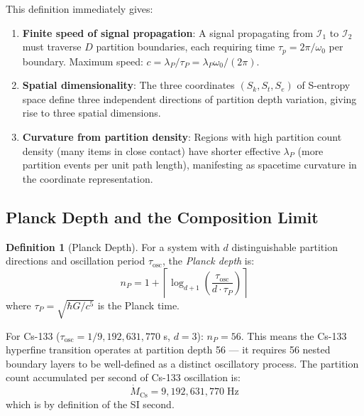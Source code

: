 \documentclass[11pt,twocolumn,a4paper]{article}
\theoremstyle{plain}
\theoremstyle{definition}
\newtheorem{definition}[theorem]{Definition}
\theoremstyle{remark}
\begin{document}
This definition immediately gives:
\begin{enumerate}
    \item \textbf{Finite speed of signal propagation}: A signal propagating
          from $\mathcal{I}_1$ to $\mathcal{I}_2$ must traverse $D$ partition
          boundaries, each requiring time $\tau_p = 2\pi/\omega_0$ per boundary.
          Maximum speed: $c = \lambda_P/\tau_P = \lambda_P \omega_0/(2\pi)$.

    \item \textbf{Spatial dimensionality}: The three coordinates $(S_k, S_t,
          S_e)$ of S-entropy space define three independent directions of
          partition depth variation, giving rise to three spatial dimensions.

    \item \textbf{Curvature from partition density}: Regions with high
          partition count density (many items in close contact) have shorter
          effective $\lambda_P$ (more partition events per unit path length),
          manifesting as spacetime curvature in the coordinate representation.
\end{enumerate}

\subsection{Planck Depth and the Composition Limit}
\label{subsec:planck_depth}

\begin{definition}[Planck Depth]
\label{def:planck_depth}
For a system with $d$ distinguishable partition directions and oscillation
period $\tau_{\mathrm{osc}}$, the \emph{Planck depth} is:
\begin{equation}
    n_P = 1 + \left\lceil \log_{d+1} \left( \frac{\tau_{\mathrm{osc}}}{d \cdot
    \tau_P} \right) \right\rceil
    \label{eq:planck_depth}
\end{equation}
where $\tau_P = \sqrt{\hbar G / c^5}$ is the Planck time.
\end{definition}

For Cs-133 ($\tau_{\mathrm{osc}} = 1/9{,}192{,}631{,}770$ s, $d = 3$): $n_P = 56$.
This means the Cs-133 hyperfine transition operates at partition depth 56 --- it
requires 56 nested boundary layers to be well-defined as a distinct oscillatory
process. The partition count accumulated per second of Cs-133 oscillation is:
\begin{equation}
    \dot{M}_{\mathrm{Cs}} = 9{,}192{,}631{,}770 \;\mathrm{Hz}
    \label{eq:cs_mdot}
\end{equation}
which is by definition of the SI second.
\end{document}
